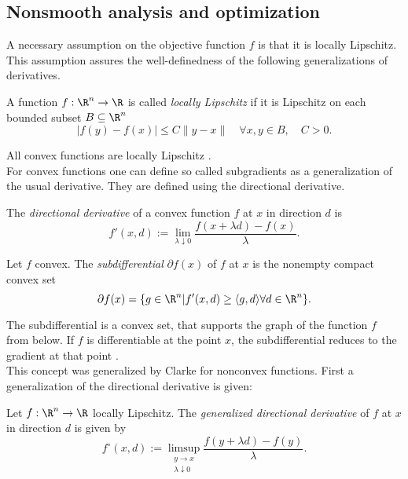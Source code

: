 \subsection{Nonsmooth analysis and optimization}
A necessary assumption on the objective function \(f\) is that it is locally Lipschitz. This assumption assures the well-definedness of the following generalizations of derivatives. \\
\begin{definition} \cite{Mifflin1977}
	A function \(f: \R^n \to \R\) is called \emph{locally Lipschitz}  if it is Lipschitz on each bounded subset \(B \subseteq \R^n\)
	\[ |f(y) - f(x)| \leq C \|y-x\| \quad \forall x,y \in B, \quad C >0. \]
\end{definition}
All convex functions are locally Lipschitz \cite{Hiriart-Urruty1996}. \\

For convex functions one can define so called subgradients as a generalization of the usual derivative. They are defined using the  directional derivative. \\
\begin{definition} \cite{Hiriart-Urruty1996}
	The \emph{directional derivative}  of a convex function \(f\) at \(x\) in direction \(d\) is 
	\[ f'(x,d) := \lim_{\lambda \downarrow 0}\frac{f(x+\lambda d) - f(x)}{\lambda}. \]
\end{definition}

\begin{definition} \cite{Hiriart-Urruty1996}
	Let \(f\) convex. The \emph{subdifferential} \(\partial f(x)\) of \(f\) at \(x\) is the nonempty compact convex set
	\[ \partial f(x) = \{g \in \R^n | f'(x,d) \geq \langle g,d\rangle \forall d \in \R^n \}. \]
\end{definition}
The subdifferential is a convex set, that supports the graph of the function \(f\) from below. If \(f\) is differentiable at the point \(x\), the subdifferential reduces to the gradient at that point \cite{Hiriart-Urruty1996}. \\

This concept was generalized by Clarke for nonconvex functions. First a generalization of the directional derivative is given: 
\begin{definition} \cite{Clarke1990}
	Let \(f: \R^n \to \R \) locally Lipschitz. The \emph{generalized directional derivative}  of \(f\) at \(x\) in direction \(d\) is given by
	\[ f^{\circ}(x,d):= \limsup_{\substack{y \to x \\ \lambda \downarrow 0}} \frac{f(y+\lambda d)-f(y)}{\lambda}. \]
\end{definition}

